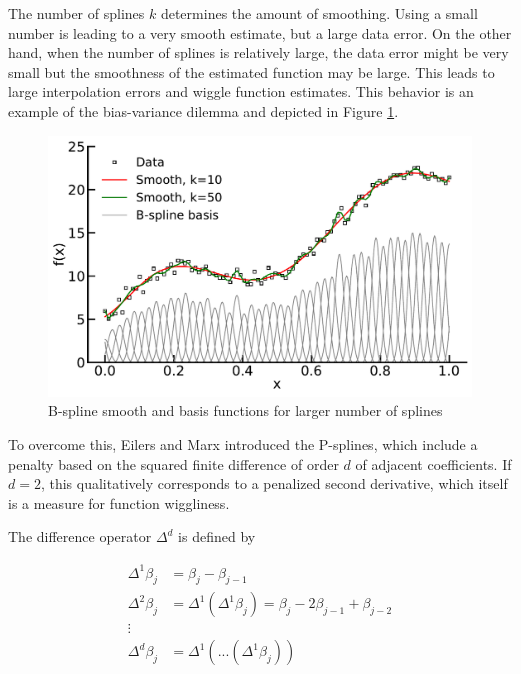 \documentclass[10pt,a4paper]{article}
\begin{document}
	
	The number of splines $k$ determines the amount of smoothing. Using a small number is leading to a very smooth estimate, but a large data error. On the other hand, when the number of splines is relatively large, the data error might be very small but the smoothness of the estimated function may be large. This leads to large interpolation errors and wiggle function estimates. This behavior is an example of the bias-variance dilemma and depicted in Figure \ref{fig:smooth_bf_large}. \cite{sammut2011}


	\begin{figure}[H]
	\centering
	\includegraphics[width=\linewidth]{../thesisplots/smooth_wiggly_bf.pdf}
	\caption{B-spline smooth and basis functions for larger number of splines}
	\label{fig:smooth_bf_large}
	\end{figure}

	To overcome this, Eilers and Marx introduced the P-splines, which include a penalty based on the squared finite difference of order $d$ of adjacent coefficients. If $d=2$, this qualitatively  corresponds to a penalized second derivative, which itself is a measure for function wiggliness. \cite{eilers1996flexible}
	
	The difference operator $\Delta^d$ is defined by
		
	
	\begin{align*}
		\Delta^1 \beta_j &= \beta_j - \beta_{j-1} \\
		\Delta^2 \beta_j &= \Delta^1(\Delta^1 \beta_j) = \beta_j - 2\beta_{j-1} + \beta_{j-2} \\ 
	  	\vdots \\ 
	  	\Delta^d \beta_j &= \Delta^1(...(\Delta^1 \beta_j))
	\end{align*}
	
\end{document}
